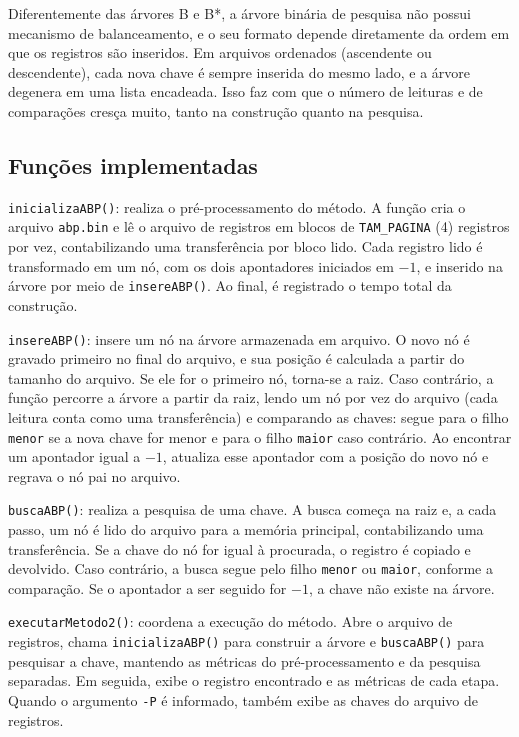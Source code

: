 \documentclass[12pt,a4paper]{article}
\begin{document}
Diferentemente das árvores B e B*, a árvore binária de pesquisa não possui mecanismo de
balanceamento, e o seu formato depende diretamente da ordem em que os registros são
inseridos. Em arquivos ordenados (ascendente ou descendente), cada nova chave é sempre
inserida do mesmo lado, e a árvore degenera em uma lista encadeada. Isso faz com que
o número de leituras e de comparações cresça muito, tanto na construção quanto na
pesquisa.

\subsection{Funções implementadas}

\texttt{inicializaABP()}: realiza o pré-processamento do método. A função cria o arquivo
\texttt{abp.bin} e lê o arquivo de registros em blocos de \texttt{TAM\_PAGINA} (4)
registros por vez, contabilizando uma transferência por bloco lido. Cada registro lido é
transformado em um nó, com os dois apontadores iniciados em $-1$, e inserido na árvore
por meio de \texttt{insereABP()}. Ao final, é registrado o tempo total da construção.

\texttt{insereABP()}: insere um nó na árvore armazenada em arquivo. O novo nó é gravado
primeiro no final do arquivo, e sua posição é calculada a partir do tamanho do arquivo.
Se ele for o primeiro nó, torna-se a raiz. Caso contrário, a função percorre a árvore a
partir da raiz, lendo um nó por vez do arquivo (cada leitura conta como uma
transferência) e comparando as chaves: segue para o filho \texttt{menor} se a nova chave
for menor e para o filho \texttt{maior} caso contrário. Ao encontrar um apontador igual
a $-1$, atualiza esse apontador com a posição do novo nó e regrava o nó pai no arquivo.

\texttt{buscaABP()}: realiza a pesquisa de uma chave. A busca começa na raiz e, a cada
passo, um nó é lido do arquivo para a memória principal, contabilizando uma
transferência. Se a chave do nó for igual à procurada, o registro é copiado e devolvido.
Caso contrário, a busca segue pelo filho \texttt{menor} ou \texttt{maior}, conforme a
comparação. Se o apontador a ser seguido for $-1$, a chave não existe na árvore.

\texttt{executarMetodo2()}: coordena a execução do método. Abre o arquivo de registros,
chama \texttt{inicializaABP()} para construir a árvore e \texttt{buscaABP()} para
pesquisar a chave, mantendo as métricas do pré-processamento e da pesquisa separadas.
Em seguida, exibe o registro encontrado e as métricas de cada etapa. Quando o argumento
\texttt{-P} é informado, também exibe as chaves do arquivo de registros.
\end{document}
